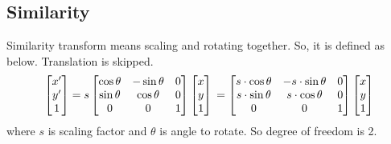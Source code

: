 \documentclass{article}
\begin{document}
\subsection{Similarity}
Similarity transform means scaling and rotating together. So, it is defined as below. Translation is skipped.
$$
\begin{bmatrix}
x' \\ y' \\ 1
\end{bmatrix}
=
s
\begin{bmatrix}
\cos\theta & -\sin\theta & 0 \\
\sin\theta & \cos\theta & 0 \\
0 & 0 & 1
\end{bmatrix}
\begin{bmatrix}
x \\ y \\ 1
\end{bmatrix}
\\
= \begin{bmatrix}
s\cdot \cos\theta & -s\cdot \sin\theta & 0 \\
s\cdot \sin\theta & s\cdot \cos\theta & 0 \\
0 & 0 & 1
\end{bmatrix}
\begin{bmatrix}
x \\ y \\ 1
\end{bmatrix}
$$
where $s$ is scaling factor and $\theta$ is angle to rotate. So degree of freedom is 2.
\end{document}
